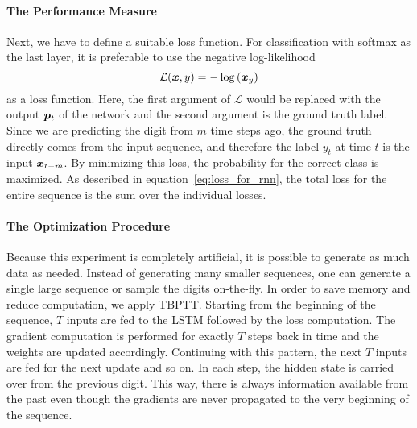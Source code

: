		\paragraph{The Performance Measure}
		Next, we have to define a suitable loss function. 
		For classification with softmax as the last layer, it is preferable to use the negative log-likelihood
		\begin{equation}
			\mathcal{L}(\bm{x}, y) = -\log\left(\bm{x}_y\right)
		\end{equation}
		as a loss function. 
		Here, the first argument of $\mathcal{L}$ would be replaced with the output $\bm{p}_t$ of the network and the second argument is the ground truth label. 
		Since we are predicting the digit from $m$ time steps ago, the ground truth directly comes from the input sequence, and therefore the label $y_t$ at time $t$ is the input $\bm{x}_{t - m}$.
		By minimizing this loss, the probability for the correct class is maximized.
		As described in equation~\ref{eq:loss_for_rnn}, the total loss for the entire sequence is the sum over the individual losses.
		
		\paragraph{The Optimization Procedure}
		Because this experiment is completely artificial, it is possible to generate as much data as needed.
		Instead of generating many smaller sequences, one can generate a single large sequence or sample the digits on-the-fly.
		In order to save memory and reduce computation, we apply TBPTT.
		Starting from the beginning of the sequence, $T$ inputs are fed to the LSTM followed by the loss computation.
		The gradient computation is performed for exactly $T$ steps back in time and the weights are updated accordingly. 
		Continuing with this pattern, the next $T$ inputs are fed for the next update and so on.
		In each step, the hidden state is carried over from the previous digit.
		This way, there is always information available from the past even though the gradients are never propagated to the very beginning of the sequence.
		
